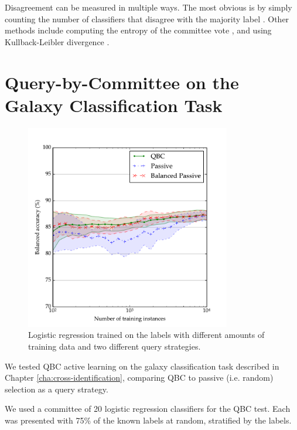         Disagreement can be measured in multiple ways. The most obvious is by
        simply counting the number of classifiers that disagree with the
        majority label \citep{seung92}. Other methods include computing the
        entropy of the committee vote \citep{mccallum98, dagan95}, and using
        Kullback-Leibler divergence \citep{mccallum98}.

\section{Query-by-Committee on the Galaxy Classification Task}
\label{sec:rgz-qbc}

    \begin{figure}
        \centering
        \includegraphics[width=0.8\textwidth]
            {images/experiments/rgz_qbc.pdf}
        \caption{Logistic regression trained on the \citeauthor{norris06}
            labels with different amounts of training data and two different
            query strategies.}
        \label{fig:rgz-qbc}
    \end{figure}

    We tested QBC active learning on the galaxy classification task described in
    Chapter \ref{cha:cross-identification}, comparing QBC to passive (i.e.
    random) selection as a query strategy.

    We used a committee of 20 logistic regression classifiers for the QBC test.
    Each was presented with 75\% of the known labels at random, stratified by
    the labels.

